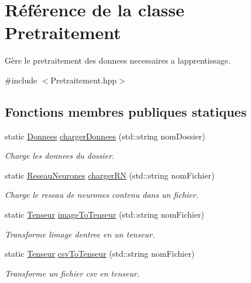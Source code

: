 \hypertarget{classPretraitement}{}\section{Référence de la classe Pretraitement}
\label{classPretraitement}


Gère le pretraitement des donnees necessaires a l\textquotesingle{}apprentissage.  




{\ttfamily \#include $<$Pretraitement.\+hpp$>$}

\subsection*{Fonctions membres publiques statiques}
\begin{DoxyCompactItemize}
\item 
static \hyperlink{classDonnees}{Donnees} \hyperlink{classPretraitement_a5f53fc5ecf4893d40577aceb269e97b5}{charger\+Donnees} (std\+::string nom\+Dossier)
\begin{DoxyCompactList}\small\item\em Charge les donnees du dossier. \end{DoxyCompactList}\item 
static \hyperlink{classReseauNeurones}{Reseau\+Neurones} \hyperlink{classPretraitement_a2d1e9cdbe1b865565f63c435923ec8e3}{charger\+RN} (std\+::string nom\+Fichier)
\begin{DoxyCompactList}\small\item\em Charge le reseau de neurones contenu dans un fichier. \end{DoxyCompactList}\item 
static \hyperlink{classTenseur}{Tenseur} \hyperlink{classPretraitement_a98c809577fe15166c5a9be25daff64a1}{image\+To\+Tenseur} (std\+::string nom\+Fichier)
\begin{DoxyCompactList}\small\item\em Transforme l\textquotesingle{}image d\textquotesingle{}entree en un tenseur. \end{DoxyCompactList}\item 
static \hyperlink{classTenseur}{Tenseur} \hyperlink{classPretraitement_a588810b1b86e11464cea64443358ae5a}{csv\+To\+Tenseur} (std\+::string nom\+Fichier)
\begin{DoxyCompactList}\small\item\em Transforme un fichier csv en tenseur. \end{DoxyCompactList}\item 

\end{DoxyCompactItemize}
